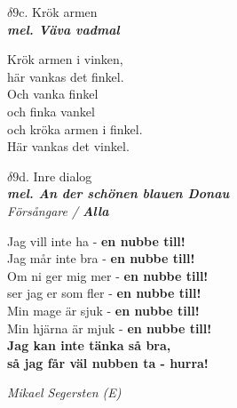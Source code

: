 \documentclass[a6paper,10pt]{article}
\newcommand{\mel}[1]{\small\textbf{\textit{mel. #1 \\}}}
\begin{document}
\newpage
\setlength{\oddsidemargin}{-0.37in}
\noindent
\begin{center}
\Large $\delta9$c. Krök armen\\ 
\mel{Väva vadmal}
\end{center}
Krök armen i vinken, \\
här vankas det finkel. \\
Och vanka finkel \\
och finka vankel \\
och kröka armen i finkel. \\
Här vankas det vinkel. 
\begin{center}
\vspace{40pt}
\Large $\delta9$d. Inre dialog\\ 
\mel{An der schönen blauen Donau}
\textit{Försångare / \textbf{Alla}}
\end{center}
Jag vill inte ha - \textbf{en nubbe till!}\\
Jag mår inte bra - \textbf{en nubbe till!}\\
Om ni ger mig mer - \textbf{en nubbe till!}\\
ser jag er som fler - \textbf{en nubbe till!}\\
\vspace{5pt}
Min mage är sjuk - \textbf{en nubbe till!}\\
Min hjärna är mjuk - \textbf{en nubbe till!}\\
\textbf{Jag kan inte tänka så bra,\\
så jag får väl nubben ta - hurra!}\\
\begin{flushright}
\textit{Mikael Segersten (E)}
\end{flushright}
\end{document}
